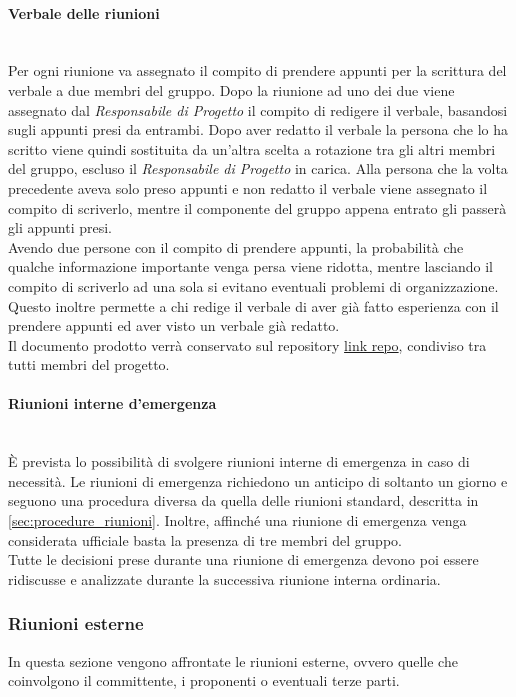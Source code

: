 \paragraph{Verbale delle riunioni}\label{sec:verbale_riunioni_interne}\mbox{}\\
Per ogni riunione va assegnato il compito di prendere appunti per la scrittura del verbale a due membri del gruppo. Dopo la riunione ad uno dei due viene assegnato dal \textit{Responsabile di Progetto} il compito di redigere il verbale, basandosi sugli appunti presi da entrambi. Dopo aver redatto il verbale la persona che lo ha scritto viene quindi sostituita da un'altra scelta a rotazione tra gli altri membri del gruppo, escluso il \textit{Responsabile di Progetto} in carica. Alla persona che la volta precedente aveva solo preso appunti e non redatto il verbale viene assegnato il compito di scriverlo, mentre il componente del gruppo appena entrato gli passerà gli appunti presi.\\
Avendo due persone con il compito di prendere appunti, la probabilità che qualche informazione importante venga persa viene ridotta, mentre lasciando il compito di scriverlo ad una sola si evitano eventuali problemi di organizzazione.
Questo inoltre permette a chi redige il verbale di aver già fatto esperienza con il prendere appunti ed aver visto un verbale già redatto.\\
Il documento prodotto verrà conservato sul repository \url{link repo}, condiviso tra tutti membri del progetto.

\paragraph{Riunioni interne d'emergenza}\label{sec:riunioni_emergenza}\mbox{}\\
È prevista lo possibilità di svolgere riunioni interne di emergenza in caso di necessità. Le riunioni di emergenza richiedono un anticipo di soltanto un giorno e seguono una procedura diversa da quella delle riunioni standard, descritta in \sezione \ref{sec:procedure_riunioni}. Inoltre, affinché una riunione di emergenza venga considerata ufficiale basta la presenza di tre membri del gruppo.\\
Tutte le decisioni prese durante una riunione di emergenza devono poi essere ridiscusse e analizzate durante la successiva riunione interna ordinaria.

\subsubsection{Riunioni esterne}
In questa sezione vengono affrontate le riunioni esterne, ovvero quelle che coinvolgono il committente, i proponenti o eventuali terze parti.

